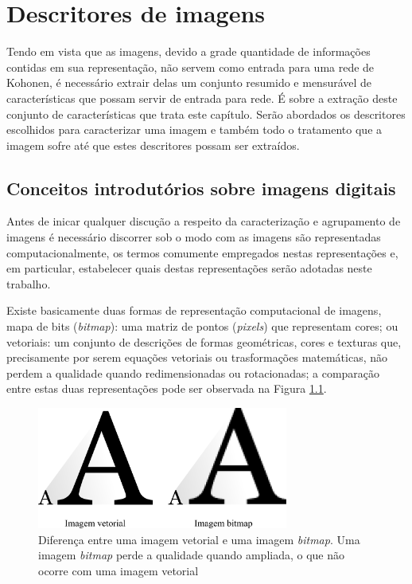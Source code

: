 \chapter{Descritores de imagens}

Tendo em vista que as imagens, devido a grade quantidade de informações
contidas em sua representação, não servem como entrada para uma rede de Kohonen,
é necessário extrair delas um conjunto resumido e mensurável de características
que possam servir de entrada para rede. É sobre a extração deste conjunto de
características que trata este capítulo. Serão abordados os descritores
escolhidos para caracterizar uma imagem e também todo o tratamento que a imagem
sofre até que estes descritores possam ser extraídos.

\section{Conceitos introdutórios sobre imagens digitais}\label{sec:conc_intro}

Antes de inicar qualquer discução a respeito da caracterização e agrupamento de
imagens é necessário discorrer sob o modo com as imagens são representadas
computacionalmente, os termos comumente empregados nestas representações e,
em particular, estabelecer quais destas representações serão adotadas neste
trabalho.

Existe basicamente duas formas de representação computacional de imagens,
mapa de bits (\textit{bitmap}): uma matriz de pontos (\textit{pixels}) que representam cores;
ou vetoriais: um conjunto de descrições de formas geométricas, cores e texturas
que, precisamente por serem equações vetoriais ou trasformações matemáticas,
não perdem a qualidade quando redimensionadas ou rotacionadas; a
comparação entre estas duas representações pode ser observada na
Figura \ref{fig:vetor_x_bitmap}.

\begin{figure}[H]
  \begin{center}
    \includegraphics[height=4cm]{imagens/vetor_x_bitmap.pdf}
  \end{center}
  \caption{ Diferença entre uma imagem vetorial e uma imagem \textit{bitmap}.
    Uma imagem \textit{bitmap} perde a qualidade quando ampliada,
    o que não ocorre com uma imagem vetorial }
  \label{fig:vetor_x_bitmap}
\end{figure}


